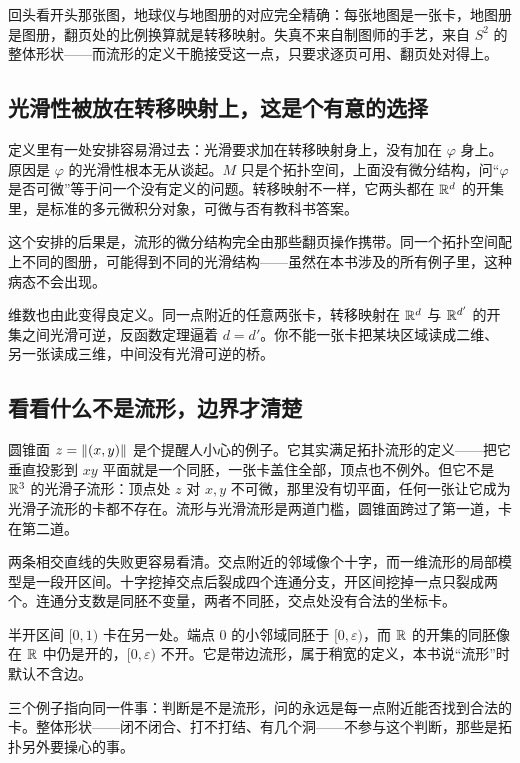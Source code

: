 回头看开头那张图，地球仪与地图册的对应完全精确：每张地图是一张卡，地图册是图册，翻页处的比例换算就是转移映射。失真不来自制图师的手艺，来自 \(S^{2}\) 的整体形状——而流形的定义干脆接受这一点，只要求逐页可用、翻页处对得上。

\subsection{光滑性被放在转移映射上，这是个有意的选择}

定义里有一处安排容易滑过去：光滑要求加在转移映射身上，没有加在 \(\varphi\) 身上。原因是 \(\varphi\) 的光滑性根本无从谈起。\(M\) 只是个拓扑空间，上面没有微分结构，问``\(\varphi\) 是否可微''等于问一个没有定义的问题。转移映射不一样，它两头都在 \(\mathbb{R}^{d}\) 的开集里，是标准的多元微积分对象，可微与否有教科书答案。

这个安排的后果是，流形的微分结构完全由那些翻页操作携带。同一个拓扑空间配上不同的图册，可能得到不同的光滑结构——虽然在本书涉及的所有例子里，这种病态不会出现。

维数也由此变得良定义。同一点附近的任意两张卡，转移映射在 \(\mathbb{R}^{d}\) 与 \(\mathbb{R}^{d'}\) 的开集之间光滑可逆，反函数定理逼着 \(d=d'\)。你不能一张卡把某块区域读成二维、另一张读成三维，中间没有光滑可逆的桥。

\subsection{看看什么不是流形，边界才清楚}

圆锥面 \(z=\left\lVert(x,y)\right\rVert\) 是个提醒人小心的例子。它其实满足拓扑流形的定义——把它垂直投影到 \(xy\) 平面就是一个同胚，一张卡盖住全部，顶点也不例外。但它不是 \(\mathbb{R}^{3}\) 的光滑子流形：顶点处 \(z\) 对 \(x,y\) 不可微，那里没有切平面，任何一张让它成为光滑子流形的卡都不存在。流形与光滑流形是两道门槛，圆锥面跨过了第一道，卡在第二道。

两条相交直线的失败更容易看清。交点附近的邻域像个十字，而一维流形的局部模型是一段开区间。十字挖掉交点后裂成四个连通分支，开区间挖掉一点只裂成两个。连通分支数是同胚不变量，两者不同胚，交点处没有合法的坐标卡。

半开区间 \([0,1)\) 卡在另一处。端点 \(0\) 的小邻域同胚于 \([0,\varepsilon)\)，而 \(\mathbb{R}\) 的开集的同胚像在 \(\mathbb{R}\) 中仍是开的，\([0,\varepsilon)\) 不开。它是带边流形，属于稍宽的定义，本书说``流形''时默认不含边。

三个例子指向同一件事：判断是不是流形，问的永远是每一点附近能否找到合法的卡。整体形状——闭不闭合、打不打结、有几个洞——不参与这个判断，那些是拓扑另外要操心的事。

